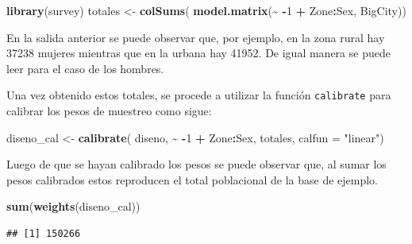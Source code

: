 \documentclass[
  12pt,
]{book}
\newenvironment{Shaded}{\begin{snugshade}}{\end{snugshade}}
\newcommand{\AttributeTok}[1]{\textcolor[rgb]{0.13,0.29,0.53}{#1}}
\newcommand{\DecValTok}[1]{\textcolor[rgb]{0.00,0.00,0.81}{#1}}
\newcommand{\FunctionTok}[1]{\textcolor[rgb]{0.13,0.29,0.53}{\textbf{#1}}}
\newcommand{\NormalTok}[1]{#1}
\newcommand{\OtherTok}[1]{\textcolor[rgb]{0.56,0.35,0.01}{#1}}
\newcommand{\SpecialCharTok}[1]{\textcolor[rgb]{0.81,0.36,0.00}{\textbf{#1}}}
\newcommand{\StringTok}[1]{\textcolor[rgb]{0.31,0.60,0.02}{#1}}
\begin{document}
\begin{Shaded}
\begin{Highlighting}[]
\FunctionTok{library}\NormalTok{(survey)}
\NormalTok{totales }\OtherTok{\textless{}{-}} \FunctionTok{colSums}\NormalTok{(}
  \FunctionTok{model.matrix}\NormalTok{(}\SpecialCharTok{\textasciitilde{}} \SpecialCharTok{{-}}\DecValTok{1} \SpecialCharTok{+}\NormalTok{ Zone}\SpecialCharTok{:}\NormalTok{Sex, BigCity)) }
\end{Highlighting}
\end{Shaded}

En la salida anterior se puede observar que, por ejemplo, en la zona rural hay 37238 mujeres mientras que en la urbana hay 41952. De igual manera se puede leer para el caso de los hombres.

Una vez obtenido estos totales, se procede a utilizar la función \texttt{calibrate} para calibrar los pesos de muestreo como sigue:

\begin{Shaded}
\begin{Highlighting}[]
\NormalTok{diseno\_cal }\OtherTok{\textless{}{-}} \FunctionTok{calibrate}\NormalTok{(}
\NormalTok{  diseno, }\SpecialCharTok{\textasciitilde{}} \SpecialCharTok{{-}}\DecValTok{1} \SpecialCharTok{+}\NormalTok{ Zone}\SpecialCharTok{:}\NormalTok{Sex, totales, }\AttributeTok{calfun =} \StringTok{"linear"}\NormalTok{)  }
\end{Highlighting}
\end{Shaded}

Luego de que se hayan calibrado los pesos se puede observar que, al sumar los pesos calibrados estos reproducen el total poblacional de la base de ejemplo.

\begin{Shaded}
\begin{Highlighting}[]
\FunctionTok{sum}\NormalTok{(}\FunctionTok{weights}\NormalTok{(diseno\_cal))}
\end{Highlighting}
\end{Shaded}

\begin{verbatim}
## [1] 150266
\end{verbatim}

\begin{Shaded}
\end{Shaded}
\end{document}
